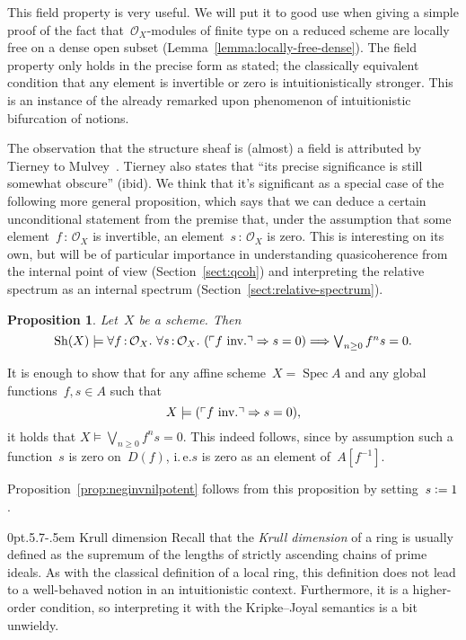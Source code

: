 \documentclass[10pt,reqno,a4paper]{amsbook}
\makeatletter
\theoremstyle{definition}
\theoremstyle{plain}
\newtheorem{prop}[defn]{Proposition}
\theoremstyle{remark}
\renewcommand{\O}{\mathcal{O}}
\newcommand{\Sh}{\mathrm{Sh}}
\DeclareMathOperator{\Spec}{Spec}
\newcommand{\?}{\,{:}\,}
\renewcommand{\_}{\mathpunct{.}\,}
\newcommand{\speak}[1]{\ulcorner\text{\textnormal{#1}}\urcorner}
\newcommand{\ie}{i.\,e.\@\xspace}
\newcommand{\inv}{inv.\@}
\newcommand{\defeq}{\vcentcolon=}
\renewenvironment{proof}[1][\proofname]{\par
  \pushQED{\qed}%
  \normalfont \topsep6\p@\@plus6\p@\relax
  \trivlist
  \item[\hskip\labelsep
        \itshape
    #1\@addpunct{.}]\ignorespaces
}{%
  \popQED\endtrivlist\@endpefalse
}
\def\subsection{\@startsection{subsection}{2}%
  {0pt}{.5\linespacing\@plus.7\linespacing}{-.5em}%
  {\normalfont\bfseries}}
\makeatother
\begin{document}
This field property is very useful. We will put it to good use when giving a
simple proof of the fact that~$\O_X$-modules of finite type on a reduced scheme
are locally free on a dense open subset (Lemma~\ref{lemma:locally-free-dense}).
The field property only holds in the precise form as stated;
the classically equivalent condition that any element is invertible or zero is
intuitionistically stronger. This is an instance of the already remarked upon
phenomenon of intuitionistic bifurcation of notions.

The observation that the structure sheaf is (almost) a field is attributed by
Tierney to Mulvey~\cite[p.~209]{tierney:spectrum}.
Tierney also states that ``its precise significance is still somewhat
obscure'' (ibid). We think that it's significant as a special case of the
following more general proposition,
which says that we can deduce a certain unconditional
statement from the premise that, under the assumption that some element~$f\?\O_X$ is invertible, an element~$s\?\O_X$ is zero. This is
interesting on its own, but will be of particular importance in understanding
quasicoherence from the internal point of view (Section~\ref{sect:qcoh}) and
interpreting the relative spectrum as an internal spectrum
(Section~\ref{sect:relative-spectrum}).

\begin{prop}\label{prop:cond-zero}
Let~$X$ be a scheme. Then
\[ \Sh(X) \models
  \forall f\?\O_X\_
  \forall s\?\O_X\_
  (\speak{$f$ \inv} \Rightarrow s = 0) \Longrightarrow
  \textstyle
  \bigvee_{n \geq 0} f^n s = 0. \]
\end{prop}
\begin{proof}It is enough to show that for any affine scheme~$X = \Spec A$ and
any global functions~$f, s \in A$ such that
\[ X \models (\speak{$f$ \inv} \Rightarrow s = 0), \]
it holds that $X \models \textstyle \bigvee_{n \geq 0} f^n s = 0$. This
indeed follows, since by assumption such a function~$s$ is zero on~$D(f)$, \ie $s$
is zero as an element of~$A[f^{-1}]$.
\end{proof}

Proposition~\ref{prop:neginvnilpotent} follows from this proposition by
setting~$s \defeq 1$.


\subsection{Krull dimension}\label{sect:krull-dimension}
Recall that the \emph{Krull dimension} of a
ring is usually defined as the supremum of the lengths of strictly
ascending chains of prime ideals. As with the classical definition of a local ring,
this definition does not lead to a well-behaved notion in an intuitionistic
context. Furthermore, it is a higher-order condition, so interpreting it
with the Kripke--Joyal semantics is a bit unwieldy.
\end{document}
